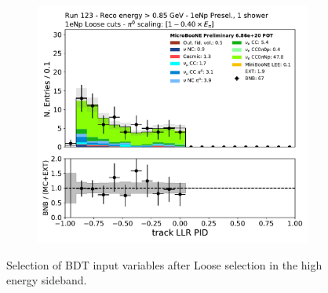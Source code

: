 \begin{figure}[H]
\begin{center}
\begin{subfigure}{0.32\textwidth}
    \end{subfigure}
    \begin{subfigure}{0.32\textwidth}
    \includegraphics[width=1.00\textwidth]{Sidebands/Figures/1eNp/HighEnergy/HiEext_NPOneShr_NPL_pi0e040/trkpid.pdf}
    \end{subfigure}
\caption{\label{fig:sb:1eNp:he:L:inputvars} Selection of BDT input variables after Loose selection in the \npsel high energy sideband.}
    \end{center}
\end{figure}

